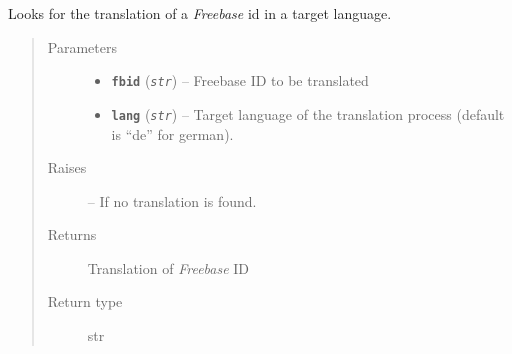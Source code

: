 \documentclass[letterpaper,10pt,english]{sphinxmanual}
\begin{document}

\begin{fulllineitems}
\label{src.prep.relations:src.prep.relations.relations.fetch_name}
Looks for the translation of a \emph{Freebase} id in a target language.
\begin{quote}\begin{description}
\item[{Parameters}] \leavevmode\begin{itemize}
\item {} 
\textbf{\texttt{fbid}} (\emph{\texttt{str}}) -- Freebase ID to be translated

\item {} 
\textbf{\texttt{lang}} (\emph{\texttt{str}}) -- Target language of the translation process (default is ``de'' for german).

\end{itemize}

\item[{Raises}] \leavevmode
{\hyperref[src.prep.relations:src.prep.relations.relations.MissingTranslationException]{}} -- If no translation is found.

\item[{Returns}] \leavevmode
Translation of \emph{Freebase} ID

\item[{Return type}] \leavevmode
str

\end{description}\end{quote}

\end{fulllineitems}

\end{document}
